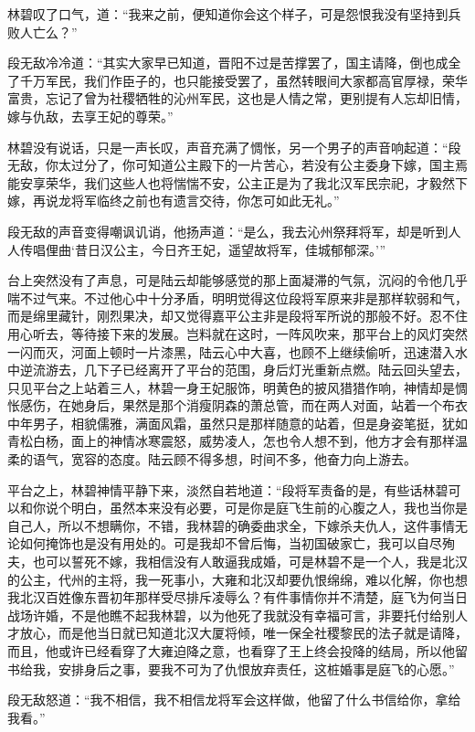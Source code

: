 林碧叹了口气，道：“我来之前，便知道你会这个样子，可是怨恨我没有坚持到兵败人亡么？”

段无敌冷冷道：“其实大家早已知道，晋阳不过是苦撑罢了，国主请降，倒也成全了千万军民，我们作臣子的，也只能接受罢了，虽然转眼间大家都高官厚禄，荣华富贵，忘记了曾为社稷牺牲的沁州军民，这也是人情之常，更别提有人忘却旧情，嫁与仇敌，去享王妃的尊荣。”

林碧没有说话，只是一声长叹，声音充满了惆怅，另一个男子的声音响起道：“段无敌，你太过分了，你可知道公主殿下的一片苦心，若没有公主委身下嫁，国主焉能安享荣华，我们这些人也将惴惴不安，公主正是为了我北汉军民宗祀，才毅然下嫁，再说龙将军临终之前也有遗言交待，你怎可如此无礼。”

段无敌的声音变得嘲讽讥诮，他扬声道：“是么，我去沁州祭拜将军，却是听到人人传唱俚曲‘昔日汉公主，今日齐王妃，遥望故将军，佳城郁郁深。’”

台上突然没有了声息，可是陆云却能够感觉的那上面凝滞的气氛，沉闷的令他几乎喘不过气来。不过他心中十分矛盾，明明觉得这位段将军原来非是那样软弱和气，而是绵里藏针，刚烈果决，却又觉得嘉平公主非是段将军所说的那般不好。忍不住用心听去，等待接下来的发展。岂料就在这时，一阵风吹来，那平台上的风灯突然一闪而灭，河面上顿时一片漆黑，陆云心中大喜，也顾不上继续偷听，迅速潜入水中逆流游去，几下子已经离开了平台的范围，身后灯光重新点燃。陆云回头望去，只见平台之上站着三人，林碧一身王妃服饰，明黄色的披风猎猎作响，神情却是惆怅感伤，在她身后，果然是那个消瘦阴森的萧总管，而在两人对面，站着一个布衣中年男子，相貌儒雅，满面风霜，虽然只是那样随意的站着，但是身姿笔挺，犹如青松白杨，面上的神情冰寒震怒，威势凌人，怎也令人想不到，他方才会有那样温柔的语气，宽容的态度。陆云顾不得多想，时间不多，他奋力向上游去。

平台之上，林碧神情平静下来，淡然自若地道：“段将军责备的是，有些话林碧可以和你说个明白，虽然本来没有必要，可是你是庭飞生前的心腹之人，我也当你是自己人，所以不想瞒你，不错，我林碧的确委曲求全，下嫁杀夫仇人，这件事情无论如何掩饰也是没有用处的。可是我却不曾后悔，当初国破家亡，我可以自尽殉夫，也可以誓死不嫁，我相信没有人敢逼我成婚，可是林碧不是一个人，我是北汉的公主，代州的主将，我一死事小，大雍和北汉却要仇恨绵绵，难以化解，你也想我北汉百姓像东晋初年那样受尽排斥凌辱么？有件事情你并不清楚，庭飞为何当日战场许婚，不是他瞧不起我林碧，以为他死了我就没有幸福可言，非要托付给别人才放心，而是他当日就已知道北汉大厦将倾，唯一保全社稷黎民的法子就是请降，而且，他或许已经看穿了大雍迫降之意，也看穿了王上终会投降的结局，所以他留书给我，安排身后之事，要我不可为了仇恨放弃责任，这桩婚事是庭飞的心愿。”

段无敌怒道：“我不相信，我不相信龙将军会这样做，他留了什么书信给你，拿给我看。”

